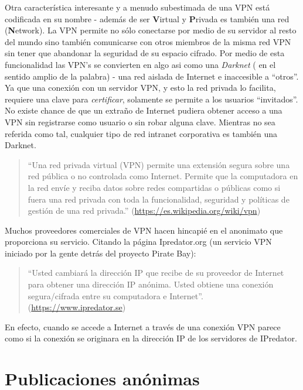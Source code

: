 \documentclass[10pt,a5paper,twoside,,]{book}
\begin{document}
Otra característica interesante y a menudo subestimada de una VPN está
codificada en su nombre - además de ser \textbf{V}irtual y
\textbf{P}rivada es también una red (\textbf{N}etwork). La VPN permite
no sólo conectarse por medio de su servidor al resto del mundo sino
también comunicarse con otros miembros de la misma red VPN sin tener que
abandonar la seguridad de su espacio cifrado. Por medio de esta
funcionalidad las VPN's se convierten en algo asi como una
\emph{Darknet} ( en el sentido amplio de la palabra) - una red aislada
de Internet e inaccesible a ``otros''. Ya que una conexión con un
servidor VPN, y esto la red privada lo facilita, requiere una clave para
\emph{certificar}, solamente se permite a los usuarios ``invitados''. No
existe chance de que un extraño de Internet pudiera obtener acceso a una
VPN sin registrarse como usuario o sin robar alguna clave. Mientras no
sea referida como tal, cualquier tipo de red intranet corporativa es
también una Darknet.

\begin{quote}
``Una red privada virtual (VPN) permite una extensión segura sobre una
red pública o no controlada como Internet. Permite que la computadora en
la red envíe y reciba datos sobre redes compartidas o públicas como si
fuera una red privada con toda la funcionalidad, seguridad y políticas
de gestión de una red privada.''
(\url{https://es.wikipedia.org/wiki/vpn})
\end{quote}

Muchos proveedores comerciales de VPN hacen hincapié en el anonimato que
proporciona su servicio. Citando la página Ipredator.org (un servicio
VPN iniciado por la gente detrás del proyecto Pirate Bay):

\begin{quote}
``Usted cambiará la dirección IP que recibe de su proveedor de Internet
para obtener una dirección IP anónima. Usted obtiene una conexión
segura/cifrada entre su computadora e Internet''.
(\url{https://www.ipredator.se})
\end{quote}

En efecto, cuando se accede a Internet a través de una conexión VPN
parece como si la conexión se originara en la dirección IP de los
servidores de IPredator.

\chapter{Publicaciones anónimas}\label{publicaciones-anuxf3nimas}
\end{document}
